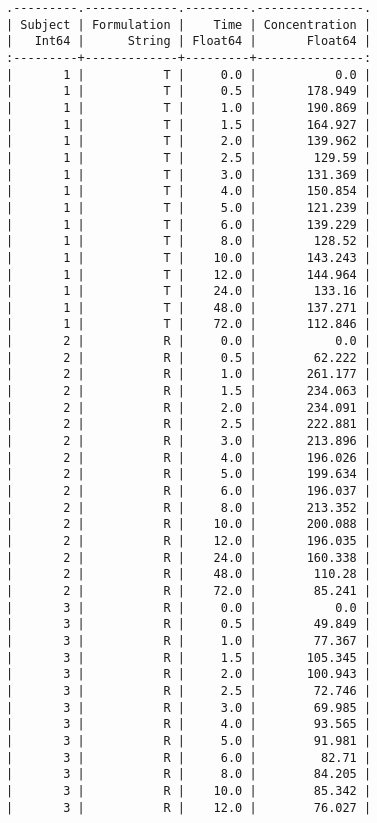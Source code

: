 \documentclass[12pt,a4paper]{article}
\begin{document}
\begin{lstlisting}
.---------.-------------.---------.---------------.
| Subject | Formulation |    Time | Concentration |
|   Int64 |      String | Float64 |       Float64 |
:---------+-------------+---------+---------------:
|       1 |           T |     0.0 |           0.0 |
|       1 |           T |     0.5 |       178.949 |
|       1 |           T |     1.0 |       190.869 |
|       1 |           T |     1.5 |       164.927 |
|       1 |           T |     2.0 |       139.962 |
|       1 |           T |     2.5 |        129.59 |
|       1 |           T |     3.0 |       131.369 |
|       1 |           T |     4.0 |       150.854 |
|       1 |           T |     5.0 |       121.239 |
|       1 |           T |     6.0 |       139.229 |
|       1 |           T |     8.0 |        128.52 |
|       1 |           T |    10.0 |       143.243 |
|       1 |           T |    12.0 |       144.964 |
|       1 |           T |    24.0 |        133.16 |
|       1 |           T |    48.0 |       137.271 |
|       1 |           T |    72.0 |       112.846 |
|       2 |           R |     0.0 |           0.0 |
|       2 |           R |     0.5 |        62.222 |
|       2 |           R |     1.0 |       261.177 |
|       2 |           R |     1.5 |       234.063 |
|       2 |           R |     2.0 |       234.091 |
|       2 |           R |     2.5 |       222.881 |
|       2 |           R |     3.0 |       213.896 |
|       2 |           R |     4.0 |       196.026 |
|       2 |           R |     5.0 |       199.634 |
|       2 |           R |     6.0 |       196.037 |
|       2 |           R |     8.0 |       213.352 |
|       2 |           R |    10.0 |       200.088 |
|       2 |           R |    12.0 |       196.035 |
|       2 |           R |    24.0 |       160.338 |
|       2 |           R |    48.0 |        110.28 |
|       2 |           R |    72.0 |        85.241 |
|       3 |           R |     0.0 |           0.0 |
|       3 |           R |     0.5 |        49.849 |
|       3 |           R |     1.0 |        77.367 |
|       3 |           R |     1.5 |       105.345 |
|       3 |           R |     2.0 |       100.943 |
|       3 |           R |     2.5 |        72.746 |
|       3 |           R |     3.0 |        69.985 |
|       3 |           R |     4.0 |        93.565 |
|       3 |           R |     5.0 |        91.981 |
|       3 |           R |     6.0 |         82.71 |
|       3 |           R |     8.0 |        84.205 |
|       3 |           R |    10.0 |        85.342 |
|       3 |           R |    12.0 |        76.027 |

\end{lstlisting}
\end{document}
